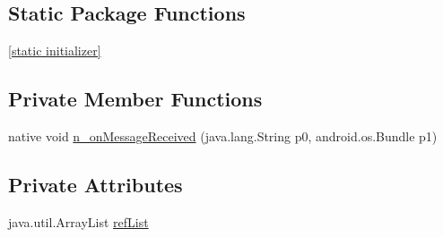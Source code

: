 \subsection*{Static Package Functions}
\begin{CompactItemize}
\item 
\hyperlink{classmono_1_1android_1_1support_1_1v7_1_1media_1_1_remote_playback_client___on_message_received_listener_implementor_45513eb6b54abfdb25c39ea0ddfa0add}{\mbox{[}static initializer\mbox{]}}
\end{CompactItemize}
\subsection*{Private Member Functions}
\begin{CompactItemize}
\item 
native void \hyperlink{classmono_1_1android_1_1support_1_1v7_1_1media_1_1_remote_playback_client___on_message_received_listener_implementor_a608c71339611eee532e97b54011412c}{n\_\-onMessageReceived} (java.lang.String p0, android.os.Bundle p1)
\end{CompactItemize}
\subsection*{Private Attributes}
\begin{CompactItemize}
\item 
java.util.ArrayList \hyperlink{classmono_1_1android_1_1support_1_1v7_1_1media_1_1_remote_playback_client___on_message_received_listener_implementor_c173cd5b21c05cc432a6767e0eb7db1e}{refList}
\end{CompactItemize}


